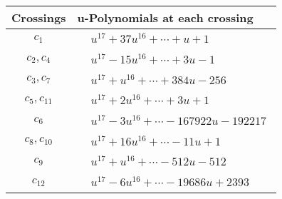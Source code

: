 \documentclass[1p]{elsarticle_modified}
\theoremstyle{definition}
\begin{document}
\begin{tabular}{m{50pt}|m{274pt}}
Crossings & \hspace{64pt}u-Polynomials at each crossing \\
\hline $$\begin{aligned}c_{1}\end{aligned}$$&$\begin{aligned}
&u^{17}+37 u^{16}+\cdots+u+1
\end{aligned}$\\
\hline $$\begin{aligned}c_{2},c_{4}\end{aligned}$$&$\begin{aligned}
&u^{17}-15 u^{16}+\cdots+3 u-1
\end{aligned}$\\
\hline $$\begin{aligned}c_{3},c_{7}\end{aligned}$$&$\begin{aligned}
&u^{17}+u^{16}+\cdots+384 u-256
\end{aligned}$\\
\hline $$\begin{aligned}c_{5},c_{11}\end{aligned}$$&$\begin{aligned}
&u^{17}+2 u^{16}+\cdots+3 u+1
\end{aligned}$\\
\hline $$\begin{aligned}c_{6}\end{aligned}$$&$\begin{aligned}
&u^{17}-3 u^{16}+\cdots-167922 u-192217
\end{aligned}$\\
\hline $$\begin{aligned}c_{8},c_{10}\end{aligned}$$&$\begin{aligned}
&u^{17}+16 u^{16}+\cdots-11 u+1
\end{aligned}$\\
\hline $$\begin{aligned}c_{9}\end{aligned}$$&$\begin{aligned}
&u^{17}+u^{16}+\cdots-512 u-512
\end{aligned}$\\
\hline $$\begin{aligned}c_{12}\end{aligned}$$&$\begin{aligned}
&u^{17}-6 u^{16}+\cdots-19686 u+2393
\end{aligned}$\\
\hline
\end{tabular}\\~\\
\end{document}
